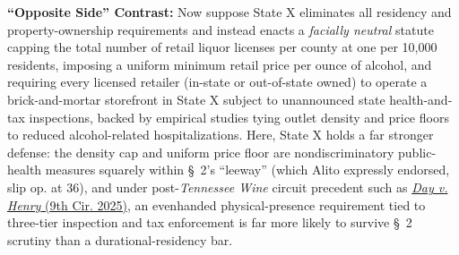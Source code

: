 \documentclass[12pt]{article}
\begin{document}
\textbf{``Opposite Side'' Contrast:} Now suppose State X eliminates all residency and property-ownership requirements and instead enacts a \textit{facially neutral} statute capping the total number of retail liquor licenses per county at one per 10,000 residents, imposing a uniform minimum retail price per ounce of alcohol, and requiring every licensed retailer (in-state or out-of-state owned) to operate a brick-and-mortar storefront in State X subject to unannounced state health-and-tax inspections, backed by empirical studies tying outlet density and price floors to reduced alcohol-related hospitalizations. Here, State X holds a far stronger defense: the density cap and uniform price floor are nondiscriminatory public-health measures squarely within \S~2's ``leeway'' (which Alito expressly endorsed, slip op. at 36), and under post-\textit{Tennessee Wine} circuit precedent such as \href{https://law.justia.com/cases/federal/appellate-courts/ca9/23-16148/23-16148-2025-03-04.html}{\textit{Day v. Henry} (9th Cir. 2025)}, an evenhanded physical-presence requirement tied to three-tier inspection and tax enforcement is far more likely to survive \S~2 scrutiny than a durational-residency bar.
\end{document}
